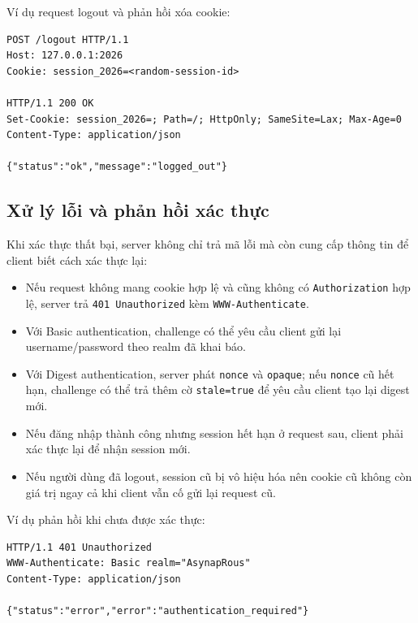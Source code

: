 Ví dụ request logout và phản hồi xóa cookie:
\begin{lstlisting}[style=engineering,caption={Logout và hủy session cookie}]
POST /logout HTTP/1.1
Host: 127.0.0.1:2026
Cookie: session_2026=<random-session-id>

HTTP/1.1 200 OK
Set-Cookie: session_2026=; Path=/; HttpOnly; SameSite=Lax; Max-Age=0
Content-Type: application/json

{"status":"ok","message":"logged_out"}
\end{lstlisting}

\subsection{Xử lý lỗi và phản hồi xác thực}
Khi xác thực thất bại, server không chỉ trả mã lỗi mà còn cung cấp thông tin để client biết cách xác thực lại:
\begin{itemize}[leftmargin=2em]
    \item Nếu request không mang cookie hợp lệ và cũng không có \texttt{Authorization} hợp lệ, server trả \texttt{401 Unauthorized} kèm \texttt{WWW-Authenticate}.
    \item Với Basic authentication, challenge có thể yêu cầu client gửi lại username/password theo realm đã khai báo.
    \item Với Digest authentication, server phát \texttt{nonce} và \texttt{opaque}; nếu \texttt{nonce} cũ hết hạn, challenge có thể trả thêm cờ \texttt{stale=true} để yêu cầu client tạo lại digest mới.
    \item Nếu đăng nhập thành công nhưng session hết hạn ở request sau, client phải xác thực lại để nhận session mới.
    \item Nếu người dùng đã logout, session cũ bị vô hiệu hóa nên cookie cũ không còn giá trị ngay cả khi client vẫn cố gửi lại request cũ.
\end{itemize}

Ví dụ phản hồi khi chưa được xác thực:
\begin{lstlisting}[style=engineering,caption={Response 401 yêu cầu xác thực lại}]
HTTP/1.1 401 Unauthorized
WWW-Authenticate: Basic realm="AsynapRous"
Content-Type: application/json

{"status":"error","error":"authentication_required"}
\end{lstlisting}
